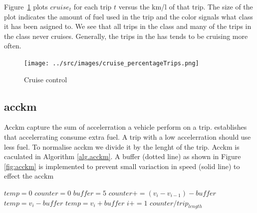 Figure~\ref{fig:cruiseTrips} plots $cruise_t$ for each trip $t$ versus the km/l of that trip.
The size of the plot indicates the amount of fuel used in the trip and the color signals what class it has been asigned to. 
We see that all trips in the \fuelLow class and many of the trips in the \fuelMedium class never cruises.
Generally, the trips in the \fuelHigh has tends to be cruising more often.

\begin{figure}
\centering
\texttt{[image: ../src/images/cruise\_percentageTrips.png]}
\caption{Cruise control}
\label{fig:cruiseTrips}
\end{figure}

\subsection{acckm}

Acckm capture the sum of accelerration a vehicle perform on a trip. \cite{} establishes that accelerrating consume extra fuel. A trip with a low accelerration should use less fuel. To normalise acckm we divide it by the lenght of the trip. Acckm is caculated in Algorithm \ref{alg.acckm}. A buffer (dotted line) as shown in Figure \ref{fig:acckm} is implemented to prevent small variaction in speed (solid line) to effect the acckm

\begin{algorithm}
\caption{$acckm$}\label{alg.acckm}
\begin{algorithmic}[1]
\State $temp = 0$
\State $counter = 0$
\State $buffer = 5$
	\State $counter += (v_i - v_{i-1}) - buffer$
	\State $temp = v_i - buffer$
	\State $temp = v_i + buffer$
\EndIf
\State $i+=1$
\EndWhile
\State \Return $ counter / trip_{length}$

\end{algorithmic}
\end{algorithm}

